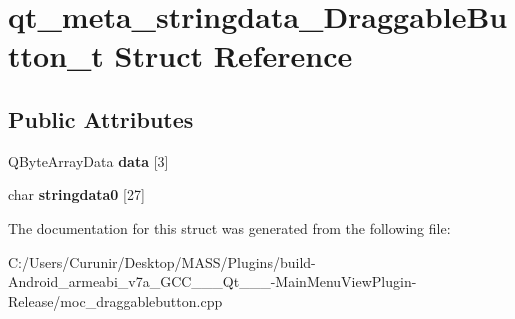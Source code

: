 \hypertarget{structqt__meta__stringdata___draggable_button__t}{}\section{qt\+\_\+meta\+\_\+stringdata\+\_\+\+Draggable\+Button\+\_\+t Struct Reference}
\label{structqt__meta__stringdata___draggable_button__t}
\subsection*{Public Attributes}
\begin{DoxyCompactItemize}
\item 
\mbox{\label{structqt__meta__stringdata___draggable_button__t_a926058472cb7975cf45e8043be606c5c}} 
Q\+Byte\+Array\+Data {\bfseries data} \mbox{[}3\mbox{]}
\item 
\mbox{\label{structqt__meta__stringdata___draggable_button__t_a2850fa3876b84066199aee756cfffafd}} 
char {\bfseries stringdata0} \mbox{[}27\mbox{]}
\end{DoxyCompactItemize}


The documentation for this struct was generated from the following file\+:\begin{DoxyCompactItemize}
\item 
C\+:/\+Users/\+Curunir/\+Desktop/\+M\+A\+S\+S/\+Plugins/build-\/\+Android\+\_\+armeabi\+\_\+v7a\+\_\+\+G\+C\+C\+\_\+\_\+\_\+\+Qt\+\_\+\_\+\_-\/\+Main\+Menu\+View\+Plugin-\/\+Release/moc\+\_\+draggablebutton.\+cpp\end{DoxyCompactItemize}
